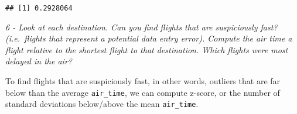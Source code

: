 \documentclass[]{article}
\newenvironment{Shaded}{\begin{snugshade}}{\end{snugshade}}
\newcommand{\KeywordTok}[1]{\textcolor[rgb]{0.13,0.29,0.53}{\textbf{#1}}}
\newcommand{\DataTypeTok}[1]{\textcolor[rgb]{0.13,0.29,0.53}{#1}}
\newcommand{\DecValTok}[1]{\textcolor[rgb]{0.00,0.00,0.81}{#1}}
\newcommand{\StringTok}[1]{\textcolor[rgb]{0.31,0.60,0.02}{#1}}
\newcommand{\OperatorTok}[1]{\textcolor[rgb]{0.81,0.36,0.00}{\textbf{#1}}}
\newcommand{\NormalTok}[1]{#1}
\theoremstyle{definition}
\theoremstyle{definition}
\theoremstyle{definition}
\theoremstyle{remark}
\begin{document}
\begin{Shaded}
\end{Shaded}

\begin{verbatim}
## [1] 0.2928064
\end{verbatim}

\emph{6 - Look at each destination. Can you find flights that are
suspiciously fast? (i.e.~flights that represent a potential data entry
error). Compute the air time a flight relative to the shortest flight to
that destination. Which flights were most delayed in the air?}

To find flights that are suspiciously fast, in other words, outliers
that are far below than the average \texttt{air\_time}, we can compute
z-score, or the number of standard deviations below/above the mean
\texttt{air\_time}.

\begin{Shaded}
\end{Shaded}
\end{document}
